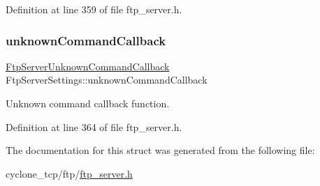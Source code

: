 Definition at line 359 of file ftp\+\_\+server.\+h.

\mbox{\label{structFtpServerSettings_a7a0ec4276b7d33f2c9e05432c7fc714b}} 
\subsubsection{\texorpdfstring{unknown\+Command\+Callback}{unknownCommandCallback}}
{\footnotesize\ttfamily \hyperlink{ftp__server_8h_a2c6f031d62de20ebc8eee7a1647df7a5}{Ftp\+Server\+Unknown\+Command\+Callback} Ftp\+Server\+Settings\+::unknown\+Command\+Callback}



Unknown command callback function. 



Definition at line 364 of file ftp\+\_\+server.\+h.



The documentation for this struct was generated from the following file\+:\begin{DoxyCompactItemize}
\item 
cyclone\+\_\+tcp/ftp/\hyperlink{ftp__server_8h}{ftp\+\_\+server.\+h}\end{DoxyCompactItemize}
